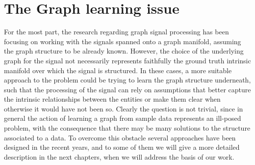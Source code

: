 \chapter{The Graph learning issue}
For the most part, the research regarding graph signal processing has been focusing on working with the signals spanned onto a graph manifold, assuming the graph structure to be already known. However, the choice of the underlying graph for the signal not necessarily represents faithfully the ground truth intrinsic manifold over which the signal is structured. In these cases, a more suitable approach to the problem could be trying to learn the graph structure underneath, such that the processing of the signal can rely on assumptions that better capture the intrinsic relationships between the entities or make them clear when otherwise it would have not been so.\cite{Maretic2017} Clearly the question is not trivial, since in general the action of learning a graph from sample data represents an ill-posed problem, with the consequence that there may be many solutions to the structure associated to a data. \cite{Dong2016} To overcome this obstacle several approaches have been designed in the recent years, and to some of them we will give a more detailed description in the next chapters, when we will address the basis of our work.
